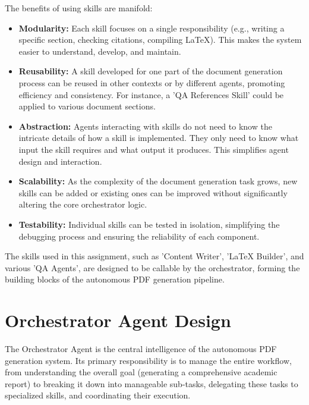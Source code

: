\documentclass{custom-academic-template}
\begin{document}
The benefits of using skills are manifold:
\begin{itemize}
    \item 	\textbf{Modularity:} Each skill focuses on a single responsibility (e.g., writing a specific section, checking citations, compiling LaTeX). This makes the system easier to understand, develop, and maintain.
    \item 	\textbf{Reusability:} A skill developed for one part of the document generation process can be reused in other contexts or by different agents, promoting efficiency and consistency. For instance, a 'QA References Skill' could be applied to various document sections.
    \item 	\textbf{Abstraction:} Agents interacting with skills do not need to know the intricate details of how a skill is implemented. They only need to know what input the skill requires and what output it produces. This simplifies agent design and interaction.
    \item 	\textbf{Scalability:} As the complexity of the document generation task grows, new skills can be added or existing ones can be improved without significantly altering the core orchestrator logic.
    \item 	\textbf{Testability:} Individual skills can be tested in isolation, simplifying the debugging process and ensuring the reliability of each component.
\end{itemize}
The skills used in this assignment, such as 'Content Writer', 'LaTeX Builder', and various 'QA Agents', are designed to be callable by the orchestrator, forming the building blocks of the autonomous PDF generation pipeline.

\section{Orchestrator Agent Design}
The Orchestrator Agent is the central intelligence of the autonomous PDF generation system. Its primary responsibility is to manage the entire workflow, from understanding the overall goal (generating a comprehensive academic report) to breaking it down into manageable sub-tasks, delegating these tasks to specialized skills, and coordinating their execution.
\end{document}
